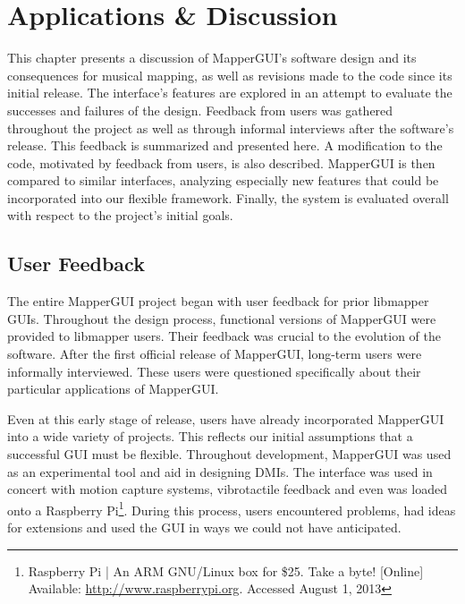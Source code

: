 \chapter{Applications \& Discussion}

This chapter presents a discussion of MapperGUI's software design and its consequences for musical mapping, as well as revisions made to the code since its initial release. The interface's features are explored in an attempt to evaluate the successes and failures of the design. Feedback from users was gathered throughout the project as well as through informal interviews after the software's release. This feedback is summarized and presented here. A modification to the code, motivated by feedback from users, is also described. MapperGUI is then compared to similar interfaces, analyzing especially new features that could be incorporated into our flexible framework. Finally, the system is evaluated overall with respect to the project's initial goals.


\section{User Feedback} %
\label{sec:user_feedback}

The entire MapperGUI project began with user feedback for prior libmapper GUIs. Throughout the design process, functional versions of MapperGUI were provided to libmapper users. Their feedback was crucial to the evolution of the software. After the first official release of MapperGUI, long-term users were informally interviewed. These users were questioned specifically about their particular applications of MapperGUI.

Even at this early stage of release, users have already incorporated MapperGUI into a wide variety of projects. This reflects our initial assumptions that a successful GUI must be flexible. Throughout development, MapperGUI was used as an experimental tool and aid in designing DMIs. The interface was used in concert with motion capture systems, vibrotactile feedback and even was loaded onto a Raspberry Pi\footnote{Raspberry Pi | An ARM GNU/Linux box for \$25. Take a byte! [Online] Available: \url{http://www.raspberrypi.org}. Accessed August 1, 2013}. During this process, users encountered problems, had ideas for extensions and used the GUI in ways we could not have anticipated.




